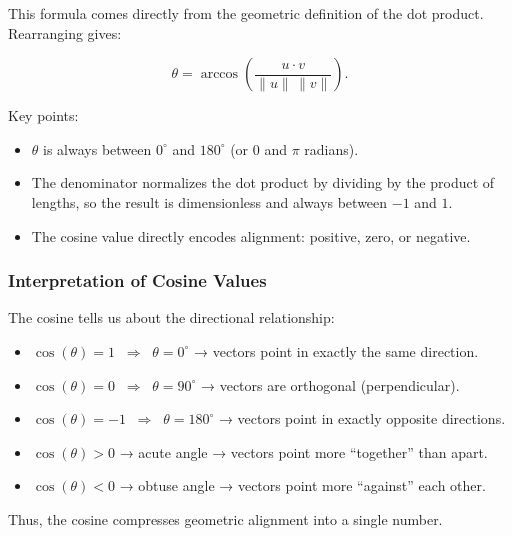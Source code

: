 \documentclass[
  letterpaper,
  DIV=11,
  numbers=noendperiod]{scrreprt}
\providecommand{\tightlist}{%
  \setlength{\itemsep}{0pt}\setlength{\parskip}{0pt}}
\begin{document}
This formula comes directly from the geometric definition of the dot
product.\\
Rearranging gives:

\[
\theta = \arccos\!\left(\frac{u \cdot v}{\|u\| \, \|v\|}\right).
\]

Key points:

\begin{itemize}
\tightlist
\item
  \(\theta\) is always between \(0^\circ\) and \(180^\circ\) (or \(0\)
  and \(\pi\) radians).\\
\item
  The denominator normalizes the dot product by dividing by the product
  of lengths, so the result is dimensionless and always between \(-1\)
  and \(1\).\\
\item
  The cosine value directly encodes alignment: positive, zero, or
  negative.
\end{itemize}

\subsubsection{Interpretation of Cosine
Values}\label{interpretation-of-cosine-values}

The cosine tells us about the directional relationship:

\begin{itemize}
\tightlist
\item
  \(\cos(\theta) = 1 \;\;\Rightarrow\;\; \theta = 0^\circ\) → vectors
  point in exactly the same direction.\\
\item
  \(\cos(\theta) = 0 \;\;\Rightarrow\;\; \theta = 90^\circ\) → vectors
  are orthogonal (perpendicular).\\
\item
  \(\cos(\theta) = -1 \;\;\Rightarrow\;\; \theta = 180^\circ\) → vectors
  point in exactly opposite directions.\\
\item
  \(\cos(\theta) > 0\) → acute angle → vectors point more ``together''
  than apart.\\
\item
  \(\cos(\theta) < 0\) → obtuse angle → vectors point more ``against''
  each other.
\end{itemize}

Thus, the cosine compresses geometric alignment into a single number.
\end{document}
